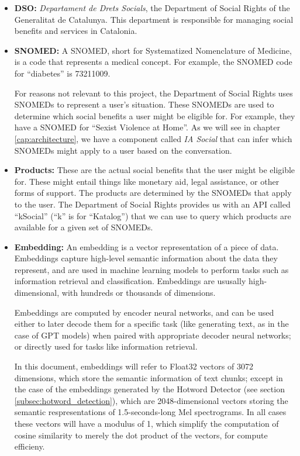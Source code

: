 \documentclass[a4paper,12pt,twoside]{ThesisStyle}
\begin{document}
\begin{itemize}
  \item \textbf{DSO:} \textit{Departament de Drets Socials}, the Department of Social Rights of the Generalitat de Catalunya. This department is responsible for managing social benefits and services in Catalonia.
  \item \textbf{SNOMED:} A SNOMED, short for Systematized Nomenclature of Medicine, is a code that represents a medical concept. For example, the SNOMED code for ``diabetes'' is 73211009.
  
  For reasons not relevant to this project, the Department of Social Rights uses SNOMEDs to represent a user's situation. These SNOMEDs are used to determine which social benefits a user might be eligible for. For example, they have a SNOMED for ``Sexist Violence at Home''. As we will see in chapter \ref{cap:architecture}, we have a component called \textit{IA Social} that can infer which SNOMEDs might apply to a user based on the conversation.
  \item \textbf{Products:} These are the actual social benefits that the user might be eligible for. These might entail things like monetary aid, legal assistance, or other forms of support. The products are determined by the SNOMEDs that apply to the user. The Department of Social Rights provides us with an API called ``kSocial'' (``k'' is for ``Katalog'') that we can use to query which products are available for a given set of SNOMEDs.
  \item \textbf{Embedding:} An embedding is a vector representation of a piece of data. Embeddings capture high-level semantic information about the data they represent, and are used in machine learning models to perform tasks such as information retrieval and classification. Embeddings are ususally high-dimensional, with hundreds or thousands of dimensions.
  
  Embeddings are computed by encoder neural networks, and can be used either to later decode them for a specific task (like generating text, as in the case of GPT models) when paired with appropriate decoder neural networks; or directly used for tasks like information retrieval.
  
  In this document, embeddings will refer to Float32 vectors of 3072 dimensions, which store the semantic information of text chunks; except in the case of the embeddings generated by the Hotword Detector (see section \ref{subsec:hotword_detection}), which are 2048-dimensional vectors storing the semantic respresentations of 1.5-seconds-long Mel spectrograms. In all cases these vectors will have a modulus of 1, which simplify the computation of cosine similarity to merely the dot product of the vectors, for compute efficieny.
\end{itemize}
\end{document}
